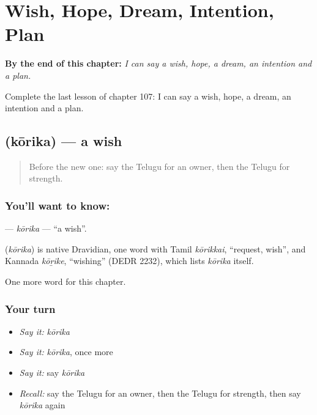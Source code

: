 
\chapter{Wish, Hope, Dream, Intention, Plan}
\label{ch:te-wish-hope-dream-intention-plan}

\begin{chapteropening}
\textbf{By the end of this chapter:} \emph{I can say a wish, hope, a dream, an intention and a plan.}

Complete the last lesson of chapter 107: I can say a wish, hope, a dream, an intention and a plan.
\end{chapteropening}

\section[\texorpdfstring{\te{కోరిక} (kōrika)}{కోరిక (kōrika)}]{ (kōrika) — a wish}

\label{lesson:TE-C107-korika}



\begin{quote}
Before the new one: say the Telugu for an owner, then the Telugu for strength.
\end{quote}

\subsection*{You'll want to know: }
\textbf{} — \emph{kōrika} — \textquotedblleft{}a wish\textquotedblright{}.

\begin{cousinweb}
\textbf{} (\emph{kōrika}) is native Dravidian, one word with Tamil \emph{kōrikkai}, \textquotedblleft{}request, wish\textquotedblright{}, and Kannada \emph{kōṟike}, \textquotedblleft{}wishing\textquotedblright{} (DEDR 2232), which lists \emph{kōrika} itself.
\end{cousinweb}

\begin{grammarlens}[title={What you've built}]
One more word for this chapter.
\end{grammarlens}

\subsection*{Your turn}
\begin{itemize}
\raggedright
  \item \emph{Say it:} \emph{kōrika}
  \item \emph{Say it:} \emph{kōrika}, once more
  \item \emph{Say it:} say \emph{kōrika}
  \item \emph{Recall:} say the Telugu for an owner, then the Telugu for strength, then say \emph{kōrika} again
\end{itemize}

